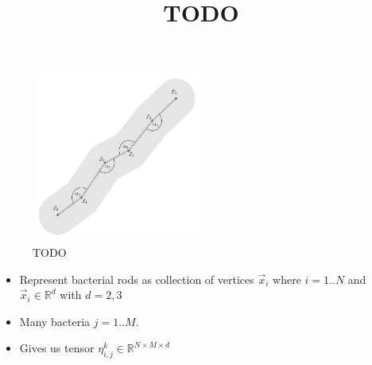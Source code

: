 \documentclass{article}
\title{TODO}
\newcommand{\R}{\mathbb{R}}
\begin{document}
\twocolumn

\section*{}

\begin{figure}
    \centering
    \includegraphics[width=0.5\textwidth]{figures/mechanics.png}
    \caption{TODO}
\end{figure}

\begin{itemize}
    \item Represent bacterial rods as collection of vertices $\vec{x}_i$ where $i=1..N$ and
        $\vec{x}_i\in\R^d$ with $d=2,3$
    \item Many bacteria $j=1..M$.
    \item Gives us tensor $\eta_{i,j}^k\in \R^{N\times M\times d}$
\end{itemize}



\end{document}
